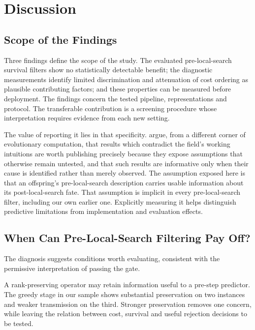 \documentclass[a4paper,fleqn]{cas-dc}
\begin{document}
\section{Discussion}\label{sec:discussion}

\subsection{Scope of the Findings}\label{sec:disc-scope}

Three findings define the scope of the study. The evaluated pre-local-search
survival filters show no statistically detectable benefit; the diagnostic
measurements identify limited discrimination and attenuation of cost ordering
as plausible contributing factors; and these properties can be measured before
deployment. The findings concern the tested pipeline, representations and
protocol. The transferable contribution is a screening procedure whose
interpretation requires evidence from each new setting.

The value of reporting it lies in that specificity.
\citet{pang2022counterintuitive} argue, from a different corner of evolutionary
computation, that results which contradict the field's working intuitions are
worth publishing precisely because they expose assumptions that otherwise remain
untested, and that such results are informative only when their cause is
identified rather than merely observed. The assumption exposed here is that an
offspring's pre-local-search description carries usable information about its
post-local-search fate. That assumption is implicit in every pre-local-search
filter, including our own earlier one. Explicitly measuring it helps distinguish
predictive limitations from implementation and evaluation effects.

\subsection{When Can Pre-Local-Search Filtering Pay Off?}\label{sec:disc-when}

The diagnosis suggests conditions worth evaluating, consistent with the
permissive interpretation of passing the gate.

A rank-preserving operator may retain information useful to a pre-step predictor.
The greedy stage in our sample shows substantial preservation on two instances
and weaker transmission on the third. Stronger preservation removes one concern,
while leaving the relation between cost, survival and useful rejection decisions
to be tested.
\end{document}
